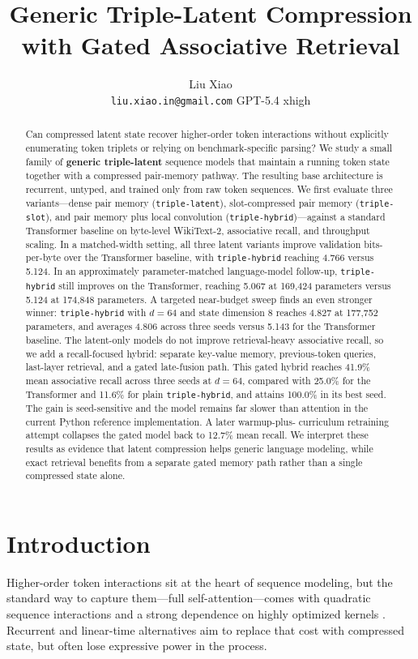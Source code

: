 \documentclass[11pt]{article}
\title{Generic Triple-Latent Compression with Gated Associative Retrieval}
\author{
Liu Xiao \\
\texttt{liu.xiao.in@gmail.com}
\And
GPT-5.4 xhigh
}
\date{}
\begin{document}
\maketitle

\begin{abstract}
Can compressed latent state recover higher-order token interactions without
explicitly enumerating token triplets or relying on benchmark-specific parsing?
We study a small family of \textbf{generic triple-latent} sequence models that
maintain a running token state together with a compressed pair-memory pathway.
The resulting base architecture is recurrent, untyped, and trained only from
raw token sequences. We first evaluate three variants---dense pair memory
(\texttt{triple-latent}), slot-compressed pair memory (\texttt{triple-slot}),
and pair memory plus local convolution (\texttt{triple-hybrid})---against a
standard Transformer baseline on byte-level WikiText-2, associative recall, and
throughput scaling. In a matched-width setting, all three latent variants
improve validation bits-per-byte over the Transformer baseline, with
\texttt{triple-hybrid} reaching 4.766 versus 5.124. In an approximately
parameter-matched language-model follow-up, \texttt{triple-hybrid} still
improves on the Transformer, reaching 5.067 at 169{,}424 parameters versus
5.124 at 174{,}848 parameters. A targeted near-budget sweep finds an even
stronger winner: \texttt{triple-hybrid} with $d=64$ and state dimension $8$
reaches 4.827 at 177{,}752 parameters, and averages 4.806 across three seeds
versus 5.143 for the Transformer baseline. The latent-only models do not
improve retrieval-heavy associative recall, so we add a recall-focused hybrid:
separate key-value memory, previous-token queries, last-layer retrieval, and a
gated late-fusion path. This gated hybrid reaches 41.9\% mean associative
recall across three seeds at $d=64$, compared with 25.0\% for the Transformer
and 11.6\% for plain \texttt{triple-hybrid}, and attains 100.0\% in its best
seed. The gain is seed-sensitive and the model remains far slower than
attention in the current Python reference implementation. A later warmup-plus-
curriculum retraining attempt collapses the gated model back to 12.7\% mean
recall. We interpret these results as evidence that latent compression helps
generic language modeling, while exact retrieval benefits from a separate gated
memory path rather than a single compressed state alone.
\end{abstract}

\section{Introduction}
Higher-order token interactions sit at the heart of sequence modeling, but the
standard way to capture them---full self-attention---comes with quadratic
sequence interactions and a strong dependence on highly optimized kernels
\citep{vaswani2017attention}. Recurrent and linear-time alternatives aim to
replace that cost with compressed state, but often lose expressive power in the
process.
\end{document}

